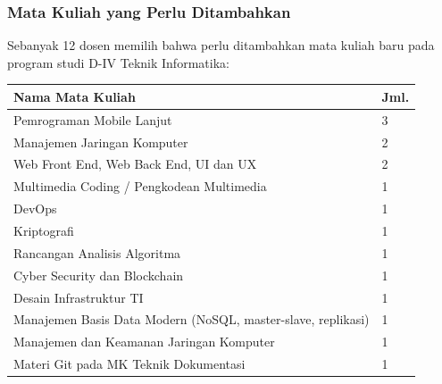 \noindent
\begin{minipage}[t]{0.48\linewidth}
\subsubsection{Mata Kuliah yang Perlu Ditambahkan}

Sebanyak 12 dosen memilih bahwa perlu ditambahkan mata kuliah baru pada program studi D-IV Teknik Informatika:

\centering
\small
\begin{tabular}{L{4.6cm}C{1.6cm}}
\toprule
Nama Mata Kuliah & Jml. \\
\midrule
Pemrograman Mobile Lanjut & 3 \\
Manajemen Jaringan Komputer & 2 \\
Web Front End, Web Back End, UI dan UX & 2 \\
Multimedia Coding / Pengkodean Multimedia & 1 \\
DevOps & 1 \\
Kriptografi & 1 \\
Rancangan Analisis Algoritma & 1 \\
Cyber Security dan Blockchain & 1 \\
Desain Infrastruktur TI & 1 \\
Manajemen Basis Data Modern (NoSQL, master-slave, replikasi) & 1 \\
Manajemen dan Keamanan Jaringan Komputer & 1 \\
Materi Git pada MK Teknik Dokumentasi & 1 \\
\bottomrule
\end{tabular}
\end{minipage}%
\hfill
